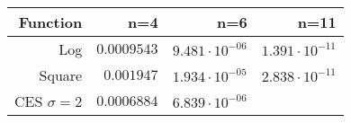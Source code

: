 \documentclass[]{article}
\begin{document}
\begin{longtable}[]{@{}rrrr@{}}
\toprule
\begin{minipage}[b]{0.10\columnwidth}\raggedleft
Function\strut
\end{minipage} & \begin{minipage}[b]{0.26\columnwidth}\raggedleft
n=4\strut
\end{minipage} & \begin{minipage}[b]{0.26\columnwidth}\raggedleft
n=6\strut
\end{minipage} & \begin{minipage}[b]{0.26\columnwidth}\raggedleft
n=11\strut
\end{minipage}\tabularnewline
\midrule
\endhead
\begin{minipage}[t]{0.10\columnwidth}\raggedleft
Log\strut
\end{minipage} & \begin{minipage}[t]{0.26\columnwidth}\raggedleft
\(0.0009543\)\strut
\end{minipage} & \begin{minipage}[t]{0.26\columnwidth}\raggedleft
\(9.481 \cdot 10^{-06}\)\strut
\end{minipage} & \begin{minipage}[t]{0.26\columnwidth}\raggedleft
\(1.391 \cdot 10^{-11}\)\strut
\end{minipage}\tabularnewline
\begin{minipage}[t]{0.10\columnwidth}\raggedleft
Square\strut
\end{minipage} & \begin{minipage}[t]{0.26\columnwidth}\raggedleft
\(0.001947\)\strut
\end{minipage} & \begin{minipage}[t]{0.26\columnwidth}\raggedleft
\(1.934 \cdot 10^{-05}\)\strut
\end{minipage} & \begin{minipage}[t]{0.26\columnwidth}\raggedleft
\(2.838 \cdot 10^{-11}\)\strut
\end{minipage}\tabularnewline
\begin{minipage}[t]{0.10\columnwidth}\raggedleft
CES \(\sigma=2\)\strut
\end{minipage} & \begin{minipage}[t]{0.26\columnwidth}\raggedleft
\(0.0006884\)\strut
\end{minipage} & \begin{minipage}[t]{0.26\columnwidth}\raggedleft
\(6.839 \cdot 10^{-06}\)\strut
\end{minipage} & \begin{minipage}[t]{0.26\columnwidth}\raggedleft

\end{minipage}
\end{longtable}
\end{document}
